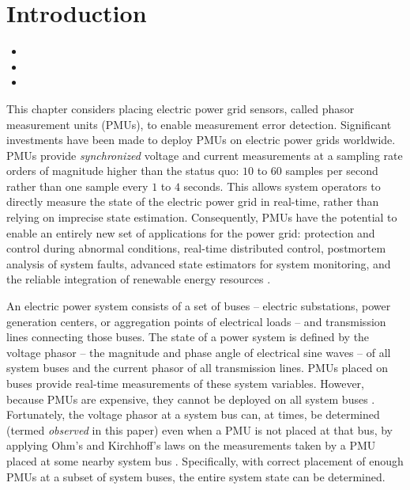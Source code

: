 \section{Introduction}
\label{sec:intro-pmu}

\begin{framed}
\begin{itemize}
        \item {} 
	
	\item {}

	\item {}
\end{itemize}
\end{framed}
               


This chapter considers placing electric power grid sensors, called phasor measurement units (PMUs), to enable measurement error detection.
Significant investments have been made to deploy PMUs on electric power grids worldwide. PMUs provide \emph{synchronized} voltage and current measurements at a sampling rate orders 
of magnitude higher than the status quo: $10$ to $60$ samples per second rather than one sample every $1$ to $4$ seconds.  This allows system operators to directly measure the state of the electric power grid in real-time, rather than 
relying on imprecise state estimation. Consequently, PMUs have the potential to enable
an entirely new set of applications for the power grid:  protection and control during abnormal conditions, real-time distributed control, postmortem analysis of system faults,
advanced state estimators for system monitoring, and the reliable integration of renewable energy resources \cite{Naspi10}.

An electric power system consists of a set of buses  -- electric substations, power generation centers, or aggregation points of electrical loads -- and transmission lines connecting those buses.
The state of a power system is defined by the voltage phasor -- the magnitude and phase angle of electrical sine waves -- of all system buses and the current phasor of all transmission lines.
PMUs placed on buses provide real-time measurements of these system variables.
However, because PMUs are expensive, they cannot be deployed on all system buses \cite{Baldwin93}\cite{LaRee10}. Fortunately, the voltage phasor at a system bus can, at times, 
be determined (termed {\it observed} in this paper) even when a PMU is not placed at that bus, by applying Ohm's and Kirchhoff's laws
on the measurements taken by a PMU placed at some nearby system bus \cite{Baldwin93}\cite{Brueni05}. Specifically, with correct placement of enough PMUs at a subset of system buses, the entire system state can be determined. 

